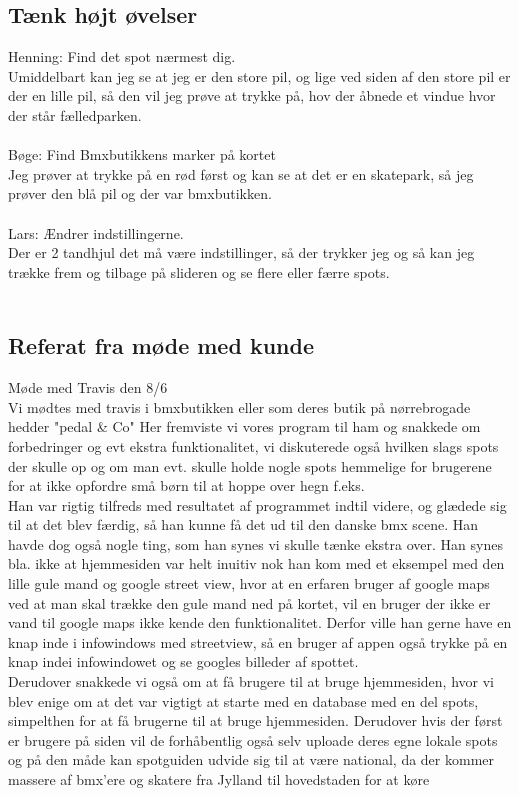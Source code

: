 \subsection*{Tænk højt øvelser}
Henning: Find det spot nærmest dig.\\
Umiddelbart kan jeg se at jeg er den store pil, og lige ved siden af den store pil er der en lille pil, så den vil jeg prøve at trykke på, hov der åbnede et vindue hvor der står fælledparken.\\\\
Bøge: Find Bmxbutikkens marker på kortet\\
Jeg prøver at trykke på en rød først og kan se at det er en skatepark, så jeg prøver den blå pil og der var bmxbutikken.\\\\
Lars: Ændrer indstillingerne.\\
Der er 2 tandhjul det må være indstillinger, så der trykker jeg og så kan jeg trække frem og tilbage på slideren og se flere eller færre spots.\\\\

\subsection*{Referat fra møde med kunde}
Møde med Travis den 8/6\\
Vi mødtes med travis i bmxbutikken eller som deres butik på nørrebrogade hedder "pedal & Co" Her fremviste vi vores program til ham og snakkede om forbedringer og evt ekstra funktionalitet, vi diskuterede også hvilken slags spots der skulle op og om man evt. skulle holde nogle spots hemmelige for brugerene for at ikke opfordre små børn til at hoppe over hegn f.eks.\\
Han var rigtig tilfreds med resultatet af programmet indtil videre, og glædede sig til at det blev færdig, så han kunne få det ud til den danske bmx scene. Han havde dog også nogle ting, som han synes vi skulle tænke ekstra over. Han synes bla. ikke at hjemmesiden var helt inuitiv nok han kom med et eksempel med den lille gule mand og google street view, hvor at en erfaren bruger af google maps ved at man skal trække den gule mand ned på kortet, vil en bruger der ikke er vand til google maps ikke kende den funktionalitet. Derfor ville han gerne have en knap inde i infowindows med streetview, så en bruger af appen også trykke på en knap indei  infowindowet og se googles billeder af spottet.\\
Derudover snakkede vi også om at få brugere til at bruge hjemmesiden, hvor vi blev enige om at det var vigtigt at starte med en database med en del spots, simpelthen for at få brugerne til at bruge hjemmesiden. Derudover hvis der først er brugere på siden vil de forhåbentlig også selv uploade deres egne lokale spots og på den måde kan spotguiden udvide sig til at være national, da der kommer massere af bmx'ere og skatere fra Jylland til hovedstaden for at køre\\
